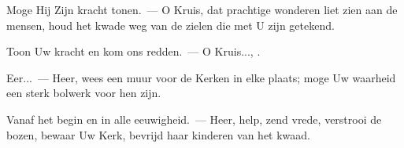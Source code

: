 \documentclass[12pt,twoside,a5paper]{article}
\begin{document}
\begin{halfparskip}
   Moge Hij Zijn kracht tonen.~--- O Kruis, dat prachtige wonderen liet zien aan de mensen, houd het kwade weg van de zielen die met U zijn getekend.

  Toon Uw kracht en kom ons redden.~--- O Kruis..., .

  Eer...~--- Heer, wees een muur voor de Kerken in elke plaats; moge Uw waarheid een sterk bolwerk voor hen zijn.

  Vanaf het begin en in alle eeuwigheid.~--- Heer, help, zend vrede, verstrooi de bozen, bewaar Uw Kerk, bevrijd haar kinderen van het kwaad.
\end{halfparskip}


\end{document}
